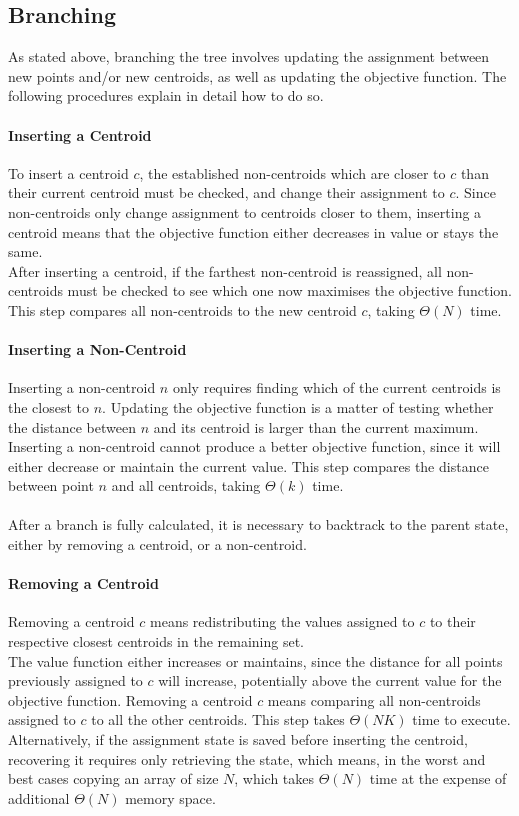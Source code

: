 \subsection{Branching}
As stated above, branching the tree involves updating the assignment between new points and/or new centroids, as well as updating the objective function. The following procedures explain in detail how to do so.
\paragraph{Inserting a Centroid}
To insert a centroid $c$, the established non-centroids which are closer to $c$ than their current centroid must be checked, and change their assignment to $c$.
Since non-centroids only change assignment to centroids closer to them, inserting a centroid means that the objective function either decreases in value or stays the same.\\
After inserting a centroid, if the farthest non-centroid is reassigned, all non-centroids must be checked to see which one now maximises the objective function.
This step compares all non-centroids to the new centroid $c$, taking $\Theta(N)$ time.

\paragraph{Inserting a Non-Centroid}
Inserting a non-centroid $n$ only requires finding which of the current centroids is the closest to $n$. Updating the objective function is a matter of testing whether the distance between $n$ and its centroid is larger than the current maximum.
Inserting a non-centroid cannot produce a better objective function, since it will either decrease or maintain the current value. 
This step compares the distance between point $n$ and all centroids, taking $\Theta(k)$ time.
\paragraph{}
After a branch is fully calculated, it is necessary to backtrack to the parent state, either by removing a centroid, or a non-centroid.
\paragraph{Removing a Centroid}
Removing a centroid $c$ means redistributing the values assigned to $c$ to their respective closest centroids in the remaining set. \\
The value function either increases or maintains, since the distance for all points previously assigned to $c$ will increase, potentially above the current value for the objective function.
Removing a centroid $c$ means comparing all non-centroids assigned to $c$ to all the other centroids. This step takes $\Theta(NK)$ time to execute. Alternatively, if the assignment state is saved before inserting the centroid, recovering it requires only retrieving the state, which means, in the worst and best cases copying an array of size $N$, which takes $\Theta(N)$ time at the expense of additional $\Theta(N)$ memory space.

